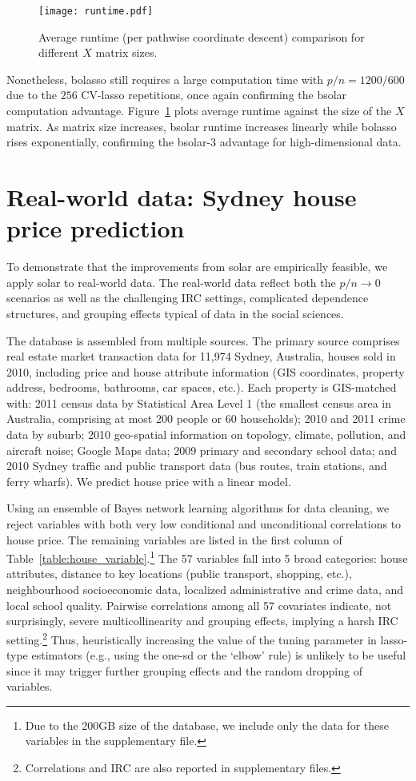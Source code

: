 \documentclass[11pt,review,authoryear]{elsarticle}
\begin{document}
\begin{figure}[ht]
  \centering
  \texttt{[image: runtime.pdf]}
  \caption{Average runtime (per pathwise coordinate descent) comparison for different $X$ matrix sizes.}
  \label{fig:runtime}
\end{figure}

Nonetheless, bolasso still requires a large computation time with $p/n=1200/600$ due to the $256$ CV-lasso repetitions, once again confirming the bsolar computation advantage. Figure~\ref{fig:runtime} plots average runtime against the size of the $X$ matrix. As matrix size increases, bsolar runtime increases linearly while bolasso rises exponentially, confirming the bsolar-3 advantage for high-dimensional data.

\section{Real-world data: Sydney house price prediction\label{section:application}}

To demonstrate that the improvements from solar are empirically feasible, we apply solar to real-world data. The real-world data reflect both the $p/n\rightarrow0$ scenarios as well as the challenging IRC settings, complicated dependence structures, and grouping effects typical of data in the social sciences.

The database is assembled from multiple sources. The primary source comprises real estate market transaction data for 11,974 Sydney, Australia, houses sold in 2010, including price and house attribute information (GIS coordinates, property address, bedrooms, bathrooms, car spaces, etc.). Each property is GIS-matched with: 2011 census data by Statistical Area Level 1 (the smallest census area in Australia, comprising at most 200 people or 60 households); 2010 and 2011 crime data by suburb; 2010 geo-spatial information on topology, climate, pollution, and aircraft noise; Google Maps data; 2009 primary and secondary school data; and 2010 Sydney traffic and public transport data (bus routes, train stations, and ferry wharfs). We predict house price with a linear model.

Using an ensemble of Bayes network learning algorithms for data cleaning, we reject variables with both very low conditional and unconditional correlations to house price. The remaining variables are listed in the first column of Table~\ref{table:house_variable}.\footnote{Due to the 200GB size of the database, we include only the data for these variables in the supplementary file.} The 57 variables fall into 5 broad categories: house attributes, distance to key locations (public transport, shopping, etc.), neighbourhood socioeconomic data, localized administrative and crime data, and local school quality. Pairwise correlations among all 57 covariates indicate, not surprisingly, severe multicollinearity and grouping effects, implying a harsh IRC setting.\footnote{Correlations and IRC are also reported in supplementary files.} Thus, heuristically increasing the value of the tuning parameter in lasso-type estimators (e.g., using the one-sd or the `elbow' rule) is unlikely to be useful since it may trigger further grouping effects and the random dropping of variables.
\end{document}
